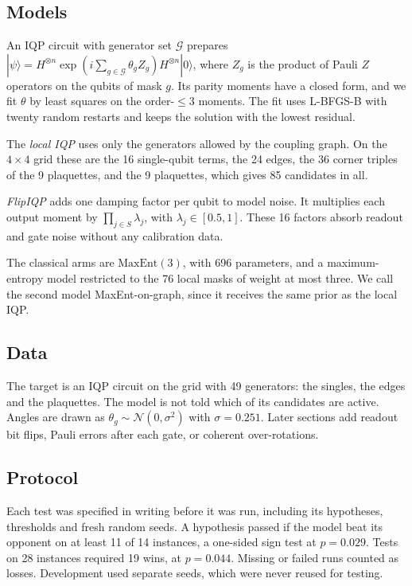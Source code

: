 \documentclass[aps,pra,twocolumn,superscriptaddress,nofootinbib]{revtex4-2}
\newcommand{\ME}{\mathrm{MaxEnt}(3)}
\begin{document}
\subsection{Models}

An IQP circuit with generator set $\mathcal{G}$ prepares
$|\psi\rangle = H^{\otimes n}\exp(i\sum_{g\in\mathcal{G}}\theta_g Z_g)H^{\otimes n}|0\rangle$,
where $Z_g$ is the product of Pauli $Z$ operators on the qubits of mask $g$.
Its parity moments have a closed form, and we fit $\theta$ by least squares on the order-$\le 3$ moments.
The fit uses L-BFGS-B with twenty random restarts and keeps the solution with the lowest residual.

The \emph{local IQP} uses only the generators allowed by the coupling graph.
On the $4\times4$ grid these are the 16 single-qubit terms, the 24 edges, the 36 corner triples of the 9 plaquettes, and
the 9 plaquettes, which gives 85 candidates in all.

\emph{FlipIQP} adds one damping factor per qubit to model noise.
It multiplies each output moment by $\prod_{j\in S}\lambda_j$, with $\lambda_j\in[0.5,1]$.
These 16 factors absorb readout and gate noise without any calibration data.

The classical arms are $\ME$, with 696 parameters, and a maximum-entropy model restricted to the 76 local masks of
weight at most three.
We call the second model MaxEnt-on-graph, since it receives the same prior as the local IQP.

\subsection{Data}

The target is an IQP circuit on the grid with 49 generators: the singles, the edges and the plaquettes.
The model is not told which of its candidates are active.
Angles are drawn as $\theta_g\sim\mathcal{N}(0,\sigma^2)$ with $\sigma=0.251$.
Later sections add readout bit flips, Pauli errors after each gate, or coherent over-rotations.

\subsection{Protocol}

Each test was specified in writing before it was run, including its hypotheses, thresholds and fresh random seeds.
A hypothesis passed if the model beat its opponent on at least 11 of 14 instances, a one-sided sign test at $p=0.029$.
Tests on 28 instances required 19 wins, at $p=0.044$.
Missing or failed runs counted as losses.
Development used separate seeds, which were never reused for testing.
\end{document}
